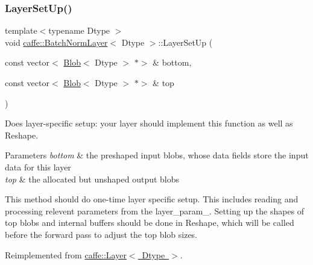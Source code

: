 \subsubsection{\texorpdfstring{Layer\+Set\+Up()}{LayerSetUp()}\hspace{0.1cm}{\footnotesize\ttfamily [1/2]}}
{\footnotesize\ttfamily template$<$typename Dtype $>$ \\
void \mbox{\hyperlink{classcaffe_1_1_batch_norm_layer}{caffe\+::\+Batch\+Norm\+Layer}}$<$ Dtype $>$\+::Layer\+Set\+Up (\begin{DoxyParamCaption}\item[{const vector$<$ \mbox{\hyperlink{classcaffe_1_1_blob}{Blob}}$<$ Dtype $>$ $\ast$$>$ \&}]{bottom,  }\item[{const vector$<$ \mbox{\hyperlink{classcaffe_1_1_blob}{Blob}}$<$ Dtype $>$ $\ast$$>$ \&}]{top }\end{DoxyParamCaption})\hspace{0.3cm}{\ttfamily [virtual]}}



Does layer-\/specific setup\+: your layer should implement this function as well as Reshape. 


\begin{DoxyParams}{Parameters}
{\em bottom} & the preshaped input blobs, whose data fields store the input data for this layer \\
\hline
{\em top} & the allocated but unshaped output blobs\\
\hline
\end{DoxyParams}
This method should do one-\/time layer specific setup. This includes reading and processing relevent parameters from the {\ttfamily layer\+\_\+param\+\_\+}. Setting up the shapes of top blobs and internal buffers should be done in {\ttfamily Reshape}, which will be called before the forward pass to adjust the top blob sizes. 

Reimplemented from \mbox{\hyperlink{classcaffe_1_1_layer_a481323a3e0972c682787f2137468c29f}{caffe\+::\+Layer$<$ Dtype $>$}}.

\mbox{\label{classcaffe_1_1_batch_norm_layer_a01e75b47ce076569ed09e08618c5be7c}} 
